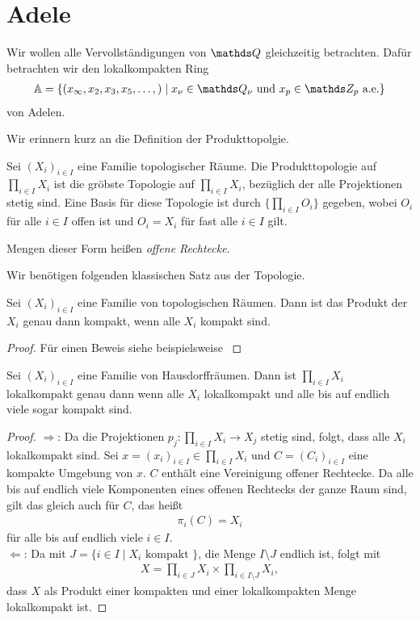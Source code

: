 \chapter{Adele}
Wir wollen alle Vervollständigungen von $\Q$ gleichzeitig betrachten.
Dafür betrachten wir den lokalkompakten Ring 
\begin{align*}
\A=\{(x_\infty,x_2,x_3,x_5,\dots,)\mid x_\nu \in \Q_\nu \text{ und } x_p \in \Z_p \text{ a.e.}\}
\end{align*}
von Adelen.

Wir erinnern kurz an die Definition der Produkttopolgie.

\begin{defi}
Sei $(X_i)_{i\in I}$ eine Familie topologischer Räume.
Die Produkttopologie auf $\prod_{i \in I} X_i$ ist die gröbste Topologie auf $\prod_{i \in I} X_i$, bezüglich der alle Projektionen stetig sind.
Eine Basis für diese Topologie ist durch $\{\prod_{i\in I}O_i\}$ gegeben, wobei $O_i$ für alle $i \in I$ offen ist und $O_i=X_i$ für fast alle $i \in I$ gilt.

Mengen dieser Form heißen \emph{offene Rechtecke}.
\end{defi}

Wir benötigen folgenden klassischen Satz aus der Topologie.
\begin{thm}[Tychonoff]
Sei $(X_i)_{i \in I}$ eine Familie von topologischen Räumen. Dann ist das Produkt der $X_i$ genau dann kompakt, wenn alle $X_i$ kompakt sind.
\end{thm}
\begin{proof}
Für einen Beweis siehe beispielsweise \cite[Theorem 7.7]{manetti}
\end{proof}

\begin{thm}
Sei $(X_i)_{i \in I}$ eine Familie von Hausdorffräumen. Dann ist $\prod_{i \in I} X_i$ lokalkompakt genau dann wenn alle $X_i$ lokalkompakt und alle bis auf endlich viele sogar kompakt sind.
\end{thm}
\begin{proof}
\glqq $\Rightarrow$\grqq : Da die Projektionen $p_j \colon \prod_{i \in I} X_i \to X_j$ stetig sind, folgt, dass alle $X_i$ lokalkompakt sind.
Sei $x=(x_i)_{i\in I} \in \prod_{i \in I} X_i$ und $C=(C_i)_{i \in I}$ eine kompakte Umgebung von $x$.
$C$ enthält eine Vereinigung offener Rechtecke. Da alle bis auf endlich viele Komponenten eines offenen Rechtecks der ganze Raum sind, gilt das gleich auch für $C$, das heißt
\begin{align*}
\pi_i(C)=X_i
\end{align*}
für alle bis auf endlich viele $i \in I$.\\
\glqq $\Leftarrow$\grqq : Da mit $J=\{i\in I \mid X_i \text{ kompakt }\}$, die Menge $I \setminus J$ endlich ist, folgt mit
\begin{align*}
X=\prod_{i \in J} X_i \times \prod_{i \in I\setminus J}X_i,
\end{align*}
dass $X$ als Produkt einer kompakten und einer lokalkompakten Menge lokalkompakt ist.
\end{proof}

